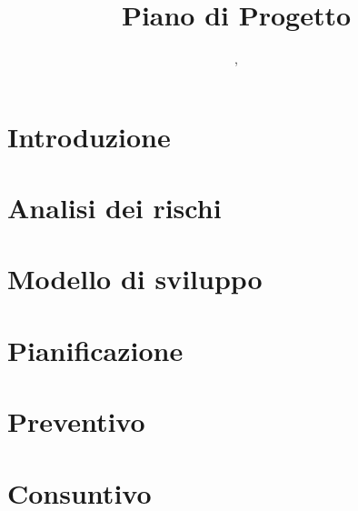 \documentclass{classes/base}
\title{Piano di Progetto}
\author{\angela, \\ \marcob}
\begin{document}
	\maketitle
	\newpage
	
	\newpage
	\tableofcontents
	\newpage
	\listoftables
	\newpage
	\listoffigures
	\newpage

	\section{Introduzione}
	
	
    \newpage
	\section{Analisi dei rischi}
	
	\newpage

	\section{Modello di sviluppo}
	

	\newpage
	\section{Pianificazione}
	

	\newpage
	\section{Preventivo}
	

	\newpage
	\section{Consuntivo}
	
	
\end{document}
